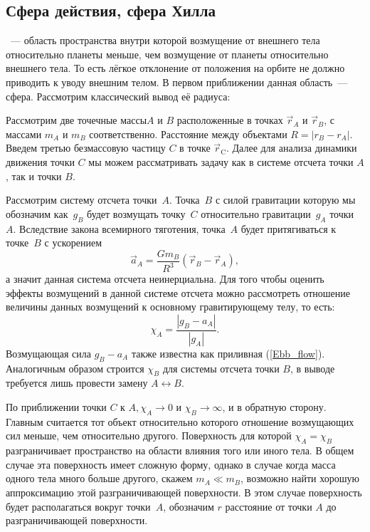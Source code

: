 \subsection{Сфера действия, сфера Хилла}
~--- область пространства внутри которой возмущение от внешнего тела относительно планеты меньше, чем возмущение от планеты относительно внешнего тела. То есть лёгкое отклонение от положения на орбите не должно приводить к уводу внешним телом. В первом приближении данная область~--- сфера. Рассмотрим классический вывод её радиуса:

Рассмотрим две точечные массы$A$ и $B$ расположенные в точках $\vec{r}_A$ и $\vec{r}_B$, с массами $m_A$ и $m_B$ соответственно. Расстояние между объектами $R=\left|r_B-r_A\right|$. Введем третью безмассовую частицу $C$ в точке $\vec{r}_{\text{C}}$. Далее для анализа динамики движения точки $C$ мы можем рассматривать задачу как в системе отсчета точки $A$, так и точки $B$.

Рассмотрим систему отсчета точки~$A$. Точка~$B$ с силой гравитации которую мы обозначим как~$g_B$ будет возмущать точку~$C$ относительно гравитации~$g_A$ точки~$A$. Вследствие закона всемирного тяготения, точка~$A$ будет притягиваться к точке~$B$ с ускорением 
\begin{equation*}
	\vec{a}_A=\frac{G m_B}{R^3}\left(\vec{r}_B-\vec{r}_A\right),
\end{equation*}
а значит данная система отсчета неинерциальна. Для того чтобы оценить эффекты возмущений в данной системе отсчета можно рассмотреть отношение величины данных возмущений к основному гравитирующему телу, то есть:
\begin{equation*}
	\chi_A=\frac{\left|g_B-a_A\right|}{\left|g_A\right|}.
\end{equation*}
Возмущающая сила $g_B-a_A$ также известна как приливная (\ref{Ebb_flow}). Аналогичным образом строится $\chi_B$ для системы отсчета точки $B$, в выводе требуется лишь провести замену $A \leftrightarrow B$.

По приближении точки $C$ к $A, \chi_A \rightarrow 0$ и $\chi_B \rightarrow \infty$, и в обратную сторону. Главным считается тот объект относительно которого отношение возмущающих сил меньше, чем относительно другого. Поверхность для которой $\chi_A=\chi_B$ разграничивает пространство на области влияния того или иного тела. В общем случае эта поверхность имеет сложную форму, однако в случае когда масса одного тела много больше другого, скажем $m_A \ll m_B$, возможно найти хорошую аппроксимацию этой разграничивающей поверхности. В этом случае поверхность будет располагаться вокруг точки~$A$, обозначим $r$ расстояние от точки $A$ до разграничивающей поверхности.

